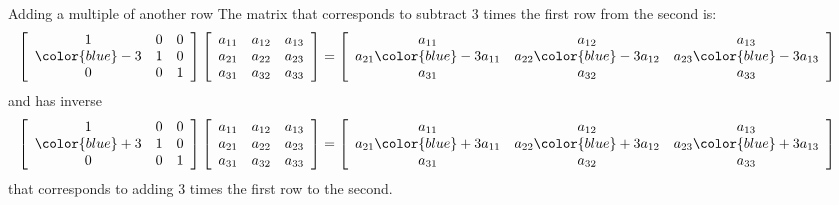 \documentclass{beamer}
\begin{document}
\begin{frame}{Adding a multiple of another row}
  The matrix that corresponds to subtract $3$ times the first row from the second is:\vfill
  \begin{equation*}\!\!\!\!\!\!\!\!\!
    \left[
      \begin{array}{ccc}
        1&0&0\\
        {\color{blue}-3}&1&0\\
        0&0&1
      \end{array}
    \right]
    \left[
      \begin{array}{ccc}
        a_{11}&a_{12}&a_{13}\\
        a_{21}&a_{22}&a_{23}\\
        a_{31}&a_{32}&a_{33}
      \end{array}
    \right]=
    \left[
      \begin{array}{ccc}
        a_{11}&a_{12}&a_{13}\\
        a_{21}{\color{blue}-3}a_{11}&a_{22}{\color{blue}-3}a_{12}&a_{23}{\color{blue}-3}a_{13}\\
        a_{31}&a_{32}&a_{33}
      \end{array}
    \right]
  \end{equation*}\vfill
  and has inverse\vfill
   \begin{equation*}\!\!\!\!\!\!\!\!\!
    \left[
      \begin{array}{ccc}
        1&0&0\\
        {\color{blue}+3}&1&0\\
        0&0&1
      \end{array}
    \right]
    \left[
      \begin{array}{ccc}
        a_{11}&a_{12}&a_{13}\\
        a_{21}&a_{22}&a_{23}\\
        a_{31}&a_{32}&a_{33}
      \end{array}
    \right]=
    \left[
      \begin{array}{ccc}
        a_{11}&a_{12}&a_{13}\\
        a_{21}{\color{blue}+3}a_{11}&a_{22}{\color{blue}+3}a_{12}&a_{23}{\color{blue}+3}a_{13}\\
        a_{31}&a_{32}&a_{33}
      \end{array}
    \right]
  \end{equation*}
  that corresponds to adding $3$ times the first row to the second.
\end{frame}
\end{document}
